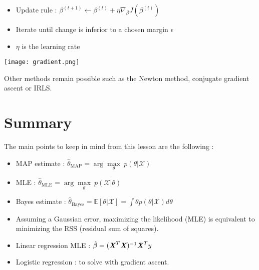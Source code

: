 \documentclass[a4paper,12pt]{article}
\begin{document}
\begin{itemize}
\item Update rule : \(\beta^{(t+1)} \leftarrow \beta^{(t)} + \eta \nabla_\beta J(\beta^{(t)})\)
\item Iterate until change is inferior to a chosen margin $\epsilon$
\item $\eta$ is the learning rate
\end{itemize}

\begin{center}
\texttt{[image: gradient.png]}
\end{center}
Other methods remain possible such as the Newton method, conjugate gradient ascent or IRLS.


\section{Summary}

The main points to keep in mind from this lesson are the following : 
\begin{itemize}
\item MAP estimate : \(\hat{\theta}_{\mbox{MAP}}=\arg\underset{\theta}\max \  p(\theta|\mathcal{X})\)
\item MLE : \(\hat{\theta}_{\mbox{MLE}}=\arg\underset{\theta}\max \  p(\mathcal{X}|\theta)\)
\item Bayes estimate : \(\hat{\theta}_{\mbox{Bayes}}=\mathbb{E}[\theta|\mathcal{X}]=\int{\!\theta p(\theta|\mathcal{X})d\theta}\)
\item Assuming a Gaussian error, maximizing the likelihood (MLE) is equivalent to minimizing the RSS (residual sum of squares). 
\item Linear regression MLE : \(\hat{\beta} = (\textbf{\textit{X}}^T\textbf{\textit{X}})^{-1} \textbf{\textit{X}}^T y\) 
\item Logistic regression : to solve with gradient ascent. 
 \end{itemize}
\end{document}
